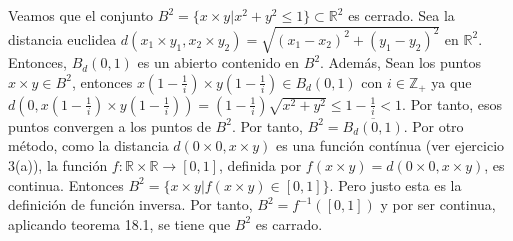 \documentclass{article}
\begin{document}
Veamos que el conjunto $B^2=\{x\times y| x^2+y^2\leq 1\}\subset\mathbb{R}^2$ es cerrado. Sea la distancia euclidea $d(x_1\times y_1,x_2\times y_2)=\sqrt{(x_1-x_2)^2+(y_1-y_2)^2}$ en $\mathbb{R}^2$. Entonces, $B_d(0,1)$ es un abierto contenido en $B^2$. Además, Sean los puntos $x\times y\in B^2$, entonces $x\left(1-\frac{1}{i}\right)\times y\left(1-\frac{1}{i}\right)\in B_d(0,1)$ con $i\in \mathbb{Z}_+$ ya que $d(0,x\left(1-\frac{1}{i}\right)\times y\left(1-\frac{1}{i}\right))=\left(1-\frac{1}{i}\right)\sqrt{x^2+y^2}\leq 1-\frac{1}{i}<1$. Por tanto, esos puntos convergen a los puntos de $B^2$. Por tanto, $B^2=\overline{B_d(0,1)}$. Por otro método, como la distancia $d(0\times 0, x\times y)$ es una función contínua (ver ejercicio 3(a)), la función $f:\mathbb{R}\times \mathbb{R}\rightarrow [0,1]$, definida por  $f(x\times y)=d(0\times 0, x\times y)$, es continua. Entonces $B^2=\{x\times y|f(x\times y)\in [0,1]\}$. Pero justo esta es la definición de función inversa. Por tanto, $B^2=f^{-1}([0,1])$ y por ser continua, aplicando teorema 18.1, se tiene que $B^2$ es carrado.
\end{document}
